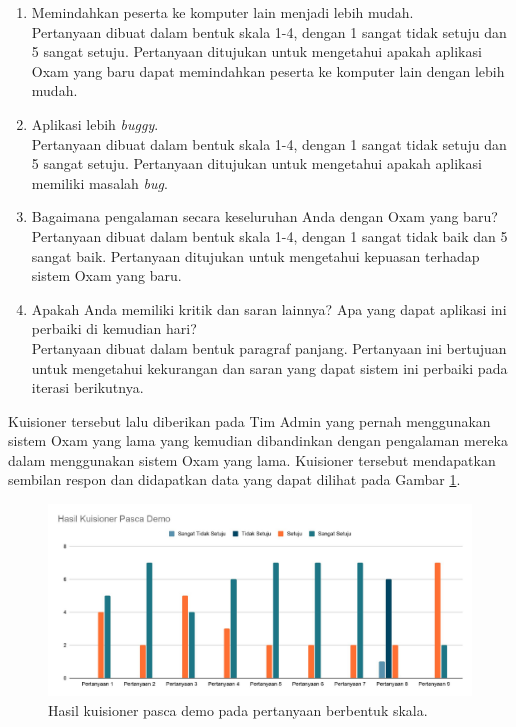 \begin{enumerate}
        \item Memindahkan peserta ke komputer lain menjadi lebih mudah. \\
            Pertanyaan dibuat dalam bentuk skala 1-4, dengan 1 sangat tidak setuju dan 5 sangat setuju.
            Pertanyaan ditujukan untuk mengetahui apakah aplikasi Oxam yang baru dapat memindahkan
            peserta ke komputer lain dengan lebih mudah.
        
        
        \item Aplikasi lebih \textit{buggy}. \\
            Pertanyaan dibuat dalam bentuk skala 1-4, dengan 1 sangat tidak setuju dan 5 sangat setuju.
            Pertanyaan ditujukan untuk mengetahui apakah aplikasi memiliki masalah \textit{bug}.
        
        
        \item Bagaimana pengalaman secara keseluruhan Anda dengan Oxam yang baru? \\
            Pertanyaan dibuat dalam bentuk skala 1-4, dengan 1 sangat tidak baik dan 5 sangat baik.
            Pertanyaan ditujukan untuk mengetahui kepuasan terhadap sistem Oxam yang baru.
        
        
        \item Apakah Anda memiliki kritik dan saran lainnya? Apa yang dapat aplikasi ini perbaiki di kemudian hari? \\
            Pertanyaan dibuat dalam bentuk paragraf panjang. Pertanyaan ini bertujuan untuk mengetahui
            kekurangan dan saran yang dapat sistem ini perbaiki pada iterasi berikutnya.
    \end{enumerate}
    
    Kuisioner tersebut lalu diberikan pada Tim Admin yang pernah menggunakan sistem Oxam yang lama yang kemudian
    dibandinkan dengan pengalaman mereka dalam menggunakan sistem Oxam yang lama. Kuisioner tersebut mendapatkan
    sembilan respon dan didapatkan data yang dapat dilihat pada Gambar \ref{fig:kuisioner_demo}.
    \begin{figure}
        \centering
        \includegraphics[width=0.75\paperwidth]{Gambar/Hasil Kuisioner.pdf}
        \caption{Hasil kuisioner pasca demo pada pertanyaan berbentuk skala.}
        \label{fig:kuisioner_demo}
    \end{figure}
    
